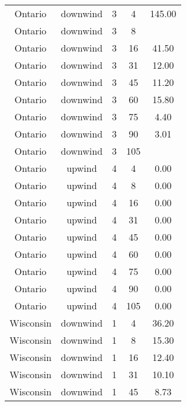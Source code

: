 \documentclass{article}
\begin{document}
\begin{longtable}[H]{ccccc}
Ontario   & downwind  & 3        & 4            & 145.00                  \\
Ontario   & downwind  & 3        & 8            &                         \\
Ontario   & downwind  & 3        & 16           & 41.50                   \\
Ontario   & downwind  & 3        & 31           & 12.00                   \\
Ontario   & downwind  & 3        & 45           & 11.20                   \\
Ontario   & downwind  & 3        & 60           & 15.80                   \\
Ontario   & downwind  & 3        & 75           & 4.40                    \\
Ontario   & downwind  & 3        & 90           & 3.01                    \\
Ontario   & downwind  & 3        & 105          &                         \\
Ontario   & upwind    & 4        & 4            & 0.00                    \\
Ontario   & upwind    & 4        & 8            & 0.00                    \\
Ontario   & upwind    & 4        & 16           & 0.00                    \\
Ontario   & upwind    & 4        & 31           & 0.00                    \\
Ontario   & upwind    & 4        & 45           & 0.00                    \\
Ontario   & upwind    & 4        & 60           & 0.00                    \\
Ontario   & upwind    & 4        & 75           & 0.00                    \\
Ontario   & upwind    & 4        & 90           & 0.00                    \\
Ontario   & upwind    & 4        & 105          & 0.00                    \\
Wisconsin & downwind  & 1        & 4            & 36.20                   \\
Wisconsin & downwind  & 1        & 8            & 15.30                   \\
Wisconsin & downwind  & 1        & 16           & 12.40                   \\
Wisconsin & downwind  & 1        & 31           & 10.10                   \\
Wisconsin & downwind  & 1        & 45           & 8.73                    \\

\end{longtable}
\end{document}
